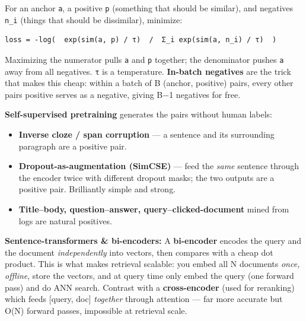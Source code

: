 \documentclass[11pt]{article}
\providecommand{\tightlist}{\setlength{\itemsep}{1pt}\setlength{\parskip}{0pt}}
\begin{document}
For an anchor \texttt{a}, a positive \texttt{p} (something that should be similar), and negatives \texttt{n\_i} (things that should be dissimilar), minimize:

\setcodelang{}

\begin{verbatim}
loss = -log(  exp(sim(a, p) / τ)  /  Σ_i exp(sim(a, n_i) / τ)  )
\end{verbatim}

Maximizing the numerator pulls \texttt{a} and \texttt{p} together; the denominator pushes \texttt{a} away from all negatives. \texttt{τ} is a temperature. \textbf{In-batch negatives} are the trick that makes this cheap: within a batch of B (anchor, positive) pairs, every other pair\textquotesingle s positive serves as a negative, giving B\(-\)1 negatives for free.

\textbf{Self-supervised pretraining} generates the pairs without human labels:

\begin{itemize}
\tightlist
\item
  \textbf{Inverse cloze / span corruption} --- a sentence and its surrounding paragraph are a positive pair.
\item
  \textbf{Dropout-as-augmentation (SimCSE)} --- feed the \emph{same} sentence through the encoder twice with different dropout masks; the two outputs are a positive pair. Brilliantly simple and strong.
\item
  \textbf{Title--body, question--answer, query--clicked-document} mined from logs are natural positives.
\end{itemize}

\textbf{Sentence-transformers \& bi-encoders:} A \textbf{bi-encoder} encodes the query and the document \emph{independently} into vectors, then compares with a cheap dot product. This is what makes retrieval scalable: you embed all N documents \emph{once, offline}, store the vectors, and at query time only embed the query (one forward pass) and do ANN search. Contrast with a \textbf{cross-encoder} (used for reranking) which feeds {[}query, doc{]} \emph{together} through attention --- far more accurate but O(N) forward passes, impossible at retrieval scale.

\end{document}
